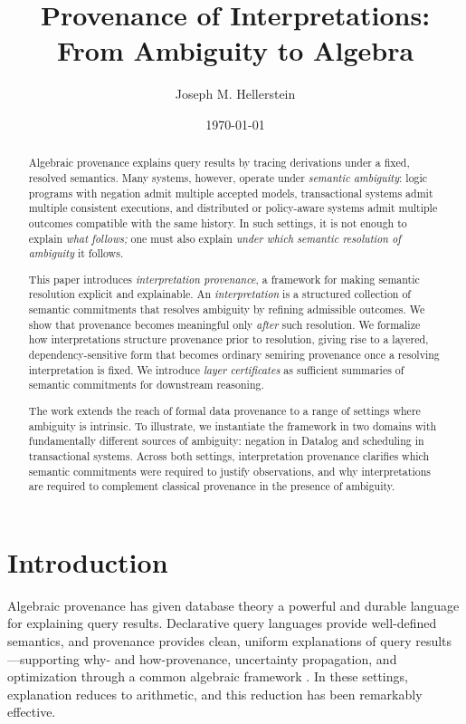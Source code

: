 \documentclass[acmsmall,nonacm]{acmart}
\title{Provenance of Interpretations: From Ambiguity to Algebra}
\author{Joseph M. Hellerstein}
\affiliation{%
  \institution{University of California, Berkeley and Amazon Web Services}
  \country{USA}
}
\date{\today}
\theoremstyle{remark}
\numberwithin{definition}{section}
\numberwithin{theorem}{section}
\numberwithin{lemma}{section}
\numberwithin{corollary}{section}
\numberwithin{remark}{section}
\numberwithin{example}{section}
\numberwithin{observation}{section}
\numberwithin{assumption}{section}
\begin{document}
\begin{abstract}
Algebraic provenance explains query results by tracing derivations under a fixed,
resolved semantics.
Many systems, however, operate under \emph{semantic ambiguity}:
logic programs with negation admit multiple accepted models, transactional
systems admit multiple consistent executions, and distributed or policy-aware
systems admit multiple outcomes compatible with the same history.
In such settings, it is not enough to explain \emph{what follows;} one must also
explain \emph{under which semantic resolution of ambiguity} it follows.

This paper introduces \emph{interpretation provenance}, a framework for making
semantic resolution explicit and explainable.
An \emph{interpretation} is a structured collection of semantic commitments that
resolves ambiguity by refining admissible outcomes.
We show that provenance becomes meaningful only \emph{after} such resolution.
We formalize how interpretations structure provenance prior to resolution, giving
rise to a layered, dependency-sensitive form that becomes ordinary semiring
provenance once a resolving interpretation is fixed.
We introduce \emph{layer certificates} as sufficient summaries of semantic
commitments for downstream reasoning.

The work extends the reach of formal data provenance to a range of 
settings where ambiguity is intrinsic.
To illustrate, we instantiate the framework in two domains with fundamentally different sources
of ambiguity: negation in Datalog and scheduling in transactional systems.
Across both settings, interpretation provenance clarifies which semantic
commitments were required to justify observations, and why interpretations
are required to complement classical provenance in the presence of ambiguity.
\end{abstract}

\maketitle

\section{Introduction}
\label{sec:intro}

Algebraic provenance has given database theory a powerful and durable language for
explaining query results.
Declarative query languages provide well-defined semantics,
and provenance provides clean, uniform explanations of query
results—supporting why- and how-provenance, uncertainty propagation,
and optimization through a common algebraic framework
\cite{green2007provenance,suciu2011probabilistic}.
In these settings, explanation reduces to arithmetic, and this reduction has been
remarkably effective.
\end{document}
